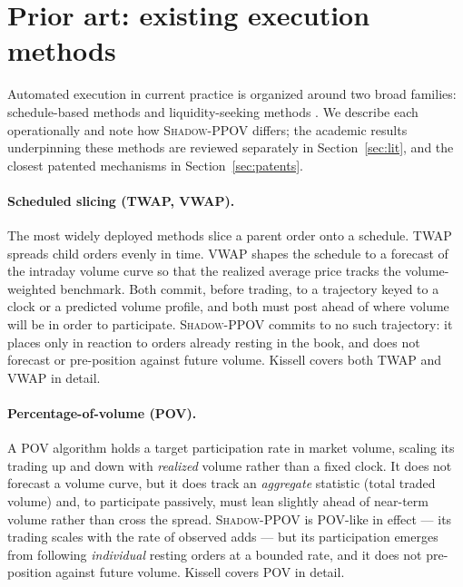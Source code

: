 \documentclass[11pt]{article}
\newcommand{\pov}{\textsc{Shadow-PPOV}}
\begin{document}
\section{Prior art: existing execution methods}
\label{sec:priorart}

Automated execution in current practice is organized around two broad families:
schedule-based methods and liquidity-seeking methods
\cite{johnson2010,kissell,laruelle2011}. We describe each operationally and note how \pov{}
differs; the academic results underpinning these methods are reviewed separately
in Section~\ref{sec:lit}, and the closest patented mechanisms in
Section~\ref{sec:patents}.

\paragraph{Scheduled slicing (TWAP, VWAP).} The most widely deployed methods
slice a parent order onto a schedule. TWAP spreads child orders evenly in
time. VWAP shapes the schedule to a forecast of the intraday volume curve so
that the realized average price tracks the volume-weighted benchmark. Both
commit, before trading, to a trajectory keyed to a clock or a predicted volume
profile, and both must post ahead of where volume will be in order to
participate. \pov{} commits to no such trajectory: it places only in reaction to
orders already resting in the book, and does not forecast or pre-position against
future volume. Kissell \cite{kissell} covers both TWAP and VWAP in detail.

\paragraph{Percentage-of-volume (POV).} A POV algorithm holds a target
participation rate in market volume, scaling its trading up and down with
\emph{realized} volume rather than a fixed clock. It does not forecast a volume
curve, but it does track an \emph{aggregate} statistic (total traded volume)
and, to participate passively, must lean slightly ahead of near-term volume
rather than cross the spread. \pov{} is POV-like in effect --- its trading scales with the rate of observed
adds --- but its participation emerges from following \emph{individual} resting
orders at a bounded rate, and it does not pre-position against future volume. Kissell
\cite{kissell} covers POV in detail.
\end{document}
